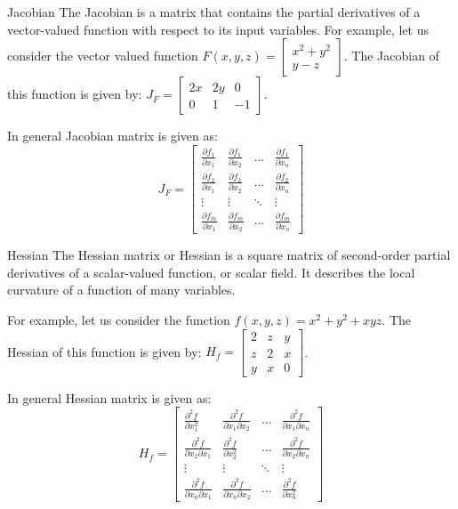 \documentclass[handout]{beamer}
\begin{document}
\begin{frame}{Jacobian}
    The Jacobian is a matrix that contains the partial derivatives of a vector-valued function with respect to its input variables.
    For example, let us consider the vector valued function $F(x, y, z) = \begin{bmatrix} x^2 + y^2 \\ y - z \end{bmatrix}$.
    The Jacobian of this function is given by: $J_F = \begin{bmatrix} 2x & 2y & 0\\ 0 & 1 & -1 \end{bmatrix}$.

    In general Jacobian matrix is given as:
    \begin{equation*}
        J_F = \begin{bmatrix} \frac{\partial f_1}{\partial x_1} & \frac{\partial f_1}{\partial x_2} & \dots & \frac{\partial f_1}{\partial x_n} \\ \frac{\partial f_2}{\partial x_1} & \frac{\partial f_2}{\partial x_2} & \dots & \frac{\partial f_2}{\partial x_n} \\ \vdots & \vdots & \ddots & \vdots \\ \frac{\partial f_m}{\partial x_1} & \frac{\partial f_m}{\partial x_2} & \dots & \frac{\partial f_m}{\partial x_n} \end{bmatrix}
    \end{equation*}

\end{frame}

\begin{frame}{Hessian}
    The Hessian matrix or Hessian is a square matrix of second-order partial derivatives of a scalar-valued function, or scalar field. It describes the local curvature of a function of many variables.

    For example, let us consider the function $f(x, y, z) = x^2 + y^2 + xyz$.
    The Hessian of this function is given by: $H_f = \begin{bmatrix} 2 & z & y\\ z & 2 & x \\ y & x & 0\end{bmatrix}$.

    In general Hessian matrix is given as:
    \begin{equation*}
        H_f = \begin{bmatrix} \frac{\partial^2 f}{\partial x_1^2} & \frac{\partial^2 f}{\partial x_1 \partial x_2} & \dots & \frac{\partial^2 f}{\partial x_1 \partial x_n} \\ \frac{\partial^2 f}{\partial x_2 \partial x_1} & \frac{\partial^2 f}{\partial x_2^2} & \dots & \frac{\partial^2 f}{\partial x_2 \partial x_n} \\ \vdots & \vdots & \ddots & \vdots \\ \frac{\partial^2 f}{\partial x_n \partial x_1} & \frac{\partial^2 f}{\partial x_n \partial x_2} & \dots & \frac{\partial^2 f}{\partial x_n^2} \end{bmatrix}
    \end{equation*}


\end{frame}
\end{document}

